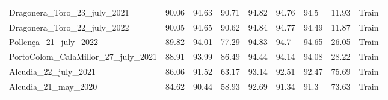 \begin{table}[H]
{\begin{tabular}{lllllllll}
            Dragonera\_Toro\_23\_july\_2021        & 90.06               &
            94.63
                                                   & 90.71               &
            94.82
                                                   & 94.76               & 94.5
                                                   & 11.93               &
            {\color[HTML]{66c2a5} Train}
            \\
            Dragonera\_Toro\_22\_july\_2022        & 90.05               &
            94.65
                                                   & 90.62               &
            94.84
                                                   & 94.77               &
            94.49
                                                   & 11.87               &
            {\color[HTML]{66c2a5} Train}
            \\
            Pollença\_21\_july\_2022               & 89.82               &
            94.01
                                                   & 77.29               &
            94.83
                                                   & 94.7                &
            94.65
                                                   & 26.05               &
            {\color[HTML]{66c2a5} Train}
            \\
            PortoColom\_CalaMillor\_27\_july\_2021 & 88.91               &
            93.99
                                                   & 86.49               &
            94.44
                                                   & 94.14               &
            94.08
                                                   & 28.22               &
            {\color[HTML]{66c2a5} Train}
            \\
            Alcudia\_22\_july\_2021                & 86.06               &
            91.52
                                                   & 63.17               &
            93.14
                                                   & 92.51               &
            92.47
                                                   & 75.69               &
            {\color[HTML]{66c2a5} Train}
            \\
            Alcudia\_21\_may\_2020                 & 84.62               &
            90.44
                                                   & 58.93               &
            92.69
                                                   & 91.34               & 91.3
                                                   & 73.63               &
            {\color[HTML]{66c2a5} Train}

\end{tabular}}
\end{table}

